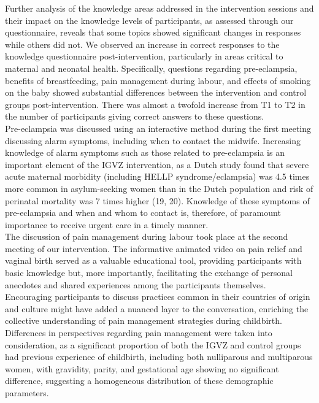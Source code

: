 \documentclass[12pt]{article}
\begin{document}
\noindent Further analysis of the knowledge areas addressed in the intervention sessions and their impact on the knowledge levels of participants, as assessed through our questionnaire, reveals that some topics showed significant changes in responses while others did not. We observed an increase in correct responses to the knowledge questionnaire post-intervention, particularly in areas critical to maternal and neonatal health. Specifically, questions regarding pre-eclampsia, benefits of breastfeeding, pain management during labour, and effects of smoking on the baby showed substantial differences between the intervention and control groups post-intervention. There was almost a twofold increase from T1 to T2 in the number of participants giving correct answers to these questions. \\

\noindent Pre-eclampsia was discussed using an interactive method during the first meeting discussing alarm symptoms, including when to contact the midwife.  Increasing knowledge of alarm symptoms such as those related to pre-eclampsia is an important element of the IGVZ intervention, as a Dutch study found that severe acute maternal morbidity (including HELLP syndrome/eclampsia) was 4.5 times more common in asylum-seeking women than in the Dutch population and risk of perinatal mortality was 7 times higher (19, 20). Knowledge of these symptoms of pre-eclampsia and when and whom to contact is, therefore, of paramount importance to receive urgent care in a timely manner. \\

\noindent The discussion of pain management during labour took place at the second meeting of our intervention. The informative animated video on pain relief and vaginal birth served as a valuable educational tool, providing participants with basic knowledge but, more importantly, facilitating the exchange of personal anecdotes and shared experiences among the participants themselves. Encouraging participants to discuss practices common in their countries of origin and culture might have added a nuanced layer to the conversation, enriching the collective understanding of pain management strategies during childbirth.  Differences in perspectives regarding pain management were taken into consideration, as a significant proportion of both the IGVZ and control groups had previous experience of childbirth, including both nulliparous and multiparous women, with gravidity, parity, and gestational age showing no significant difference, suggesting a homogeneous distribution of these demographic parameters. \\
\end{document}
